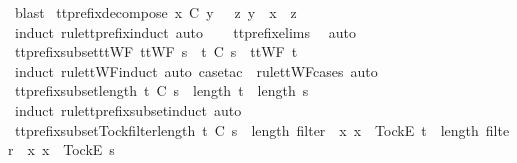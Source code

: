 \ blast%
\endisatagproof
{\isafoldproof}%
%
\isadelimproof
\isanewline
%
\endisadelimproof
\isanewline
{}\isamarkupfalse%
\ tt{\isacharunderscore}prefix{\isacharunderscore}decompose{\isacharcolon}\ {\isachardoublequoteopen}x\ {\isasymle}\isactrlsub C\ y\ {\isasymLongrightarrow}\ {\isasymexists}\ z{\isachardot}\ y\ {\isacharequal}\ x\ {\isacharat}\ z{\isachardoublequoteclose}\isanewline
%
\isadelimproof
\ \ %
\endisadelimproof
%
\isatagproof
{}\isamarkupfalse%
\ {\isacharparenleft}induct\ rule{\isacharcolon}tt{\isacharunderscore}prefix{\isachardot}induct{\isacharcomma}\ auto{\isacharparenright}\isanewline
\ \ \isamarkupfalse%
\ tt{\isacharunderscore}prefix{\isachardot}elims{\isacharparenleft}{}{\isacharparenright}\ \isamarkupfalse%
\ auto%
\endisatagproof
{\isafoldproof}%
%
\isadelimproof
\isanewline
%
\endisadelimproof
\isanewline
{}\isamarkupfalse%
\ tt{\isacharunderscore}prefix{\isacharunderscore}subset{\isacharunderscore}ttWF{\isacharcolon}\ {\isachardoublequoteopen}ttWF\ s\ {\isasymLongrightarrow}\ t\ {\isasymlesssim}\isactrlsub C\ s\ {\isasymLongrightarrow}\ ttWF\ t{\isachardoublequoteclose}\isanewline
%
\isadelimproof
\ \ %
\endisadelimproof
%
\isatagproof
{}\isamarkupfalse%
\ {\isacharparenleft}induct\ rule{\isacharcolon}ttWF{}{\isachardot}induct{\isacharcomma}\ auto{\isacharcomma}\ {\isacharparenleft}case{\isacharunderscore}tac\ {\isasymrho}\ rule{\isacharcolon}ttWF{\isachardot}cases{\isacharcomma}\ auto{\isacharparenright}{\isacharplus}{\isacharparenright}%
\endisatagproof
{\isafoldproof}%
%
\isadelimproof
\isanewline
%
\endisadelimproof
\isanewline
{}\isamarkupfalse%
\ tt{\isacharunderscore}prefix{\isacharunderscore}subset{\isacharunderscore}length{\isacharcolon}\ {\isachardoublequoteopen}t\ {\isasymlesssim}\isactrlsub C\ s\ {\isasymLongrightarrow}\ length\ t\ {\isasymle}\ length\ s{\isachardoublequoteclose}\isanewline
%
\isadelimproof
\ \ %
\endisadelimproof
%
\isatagproof
{}\isamarkupfalse%
\ {\isacharparenleft}induct\ rule{\isacharcolon}tt{\isacharunderscore}prefix{\isacharunderscore}subset{\isachardot}induct{\isacharcomma}\ auto{\isacharparenright}%
\endisatagproof
{\isafoldproof}%
%
\isadelimproof
\isanewline
%
\endisadelimproof
\isanewline
{}\isamarkupfalse%
\ tt{\isacharunderscore}prefix{\isacharunderscore}subset{\isacharunderscore}Tock{\isacharunderscore}filter{\isacharunderscore}length{\isacharcolon}\ {\isachardoublequoteopen}t\ {\isasymlesssim}\isactrlsub C\ s\ {\isasymLongrightarrow}\ length\ {\isacharparenleft}filter\ {\isacharparenleft}{\isasymlambda}\ x{\isachardot}\ x\ {\isacharequal}\ {\isacharbrackleft}Tock{\isacharbrackright}\isactrlsub E{\isacharparenright}\ t{\isacharparenright}\ {\isasymle}\ length\ {\isacharparenleft}filter\ {\isacharparenleft}{\isasymlambda}\ x{\isachardot}\ x\ {\isacharequal}\ {\isacharbrackleft}Tock{\isacharbrackright}\isactrlsub E{\isacharparenright}\ s{\isacharparenright}{\isachardoublequoteclose}\isanewline

